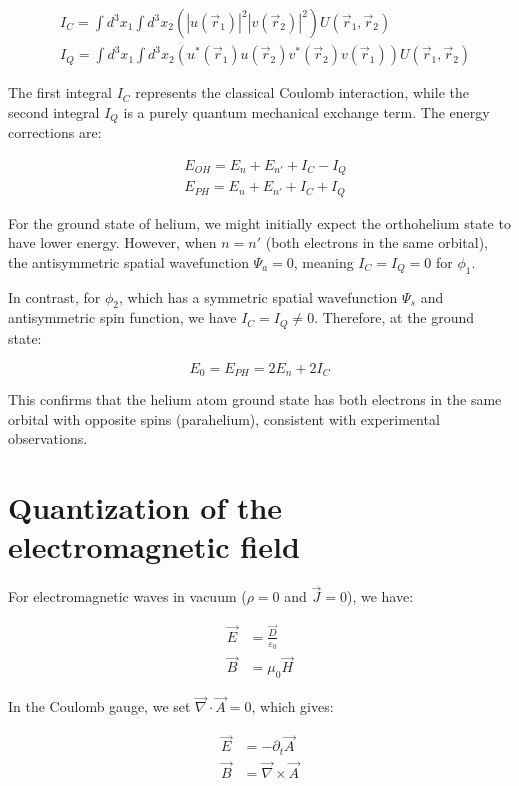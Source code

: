 \documentclass[italian]{HKNdocument}
\begin{document}
\begin{align}
&I_C=\int d^3x_1\int d^3x_2(|u(\vec{r}_1)|^2|v(\vec{r}_2)|^2)U(\vec{r}_1,\vec{r}_2)\\
&I_Q=\int d^3x_1\int d^3x_2(u^*(\vec{r}_1)u(\vec{r}_2)v^*(\vec{r}_2)v(\vec{r}_1))U(\vec{r}_1,\vec{r}_2)
\end{align}

The first integral $I_C$ represents the classical Coulomb interaction, while the second integral $I_Q$ is a purely quantum mechanical exchange term. The energy corrections are:

\begin{align}
&E_{OH}=E_n+E_{n'}+I_C-I_Q\\
&E_{PH}=E_n+E_{n'}+I_C+I_Q
\end{align}


For the ground state of helium, we might initially expect the orthohelium state to have lower energy. However, when $n=n'$ (both electrons in the same orbital), the antisymmetric spatial wavefunction $\Psi_a=0$, meaning $I_C=I_Q=0$ for $\phi_1$.

In contrast, for $\phi_2$, which has a symmetric spatial wavefunction $\Psi_s$ and antisymmetric spin function, we have $I_C=I_Q\neq 0$. Therefore, at the ground state:

\begin{equation}
E_0=E_{PH}=2E_n+2I_C
\end{equation}

This confirms that the helium atom ground state has both electrons in the same orbital with opposite spins (parahelium), consistent with experimental observations.

\section{Quantization of the electromagnetic field}
For electromagnetic waves in vacuum ($\rho=0$ and $\vec{J}=0$), we have:

\begin{align}
\vec{E}&=\frac{\vec{D}}{\varepsilon_0} \\
\vec{B}&=\mu_0\vec{H}
\end{align}

In the Coulomb gauge, we set $\vec{\nabla}\cdot\vec{A}=0$, which gives:

\begin{align}
\vec{E}&=-\partial_t\vec{A}\\
\vec{B}&=\vec{\nabla}\times\vec{A}
\end{align}
\end{document}
